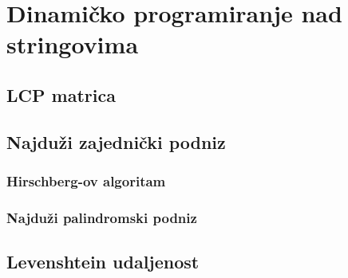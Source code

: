\section{Dinami\v cko programiranje nad stringovima}

\subsection{LCP matrica}

\subsection{Najdu\v zi zajedni\v cki podniz}

\subsubsection{Hirschberg-ov algoritam}

\subsubsection{Najdu\v zi palindromski podniz}

\subsection{Levenshtein udaljenost}